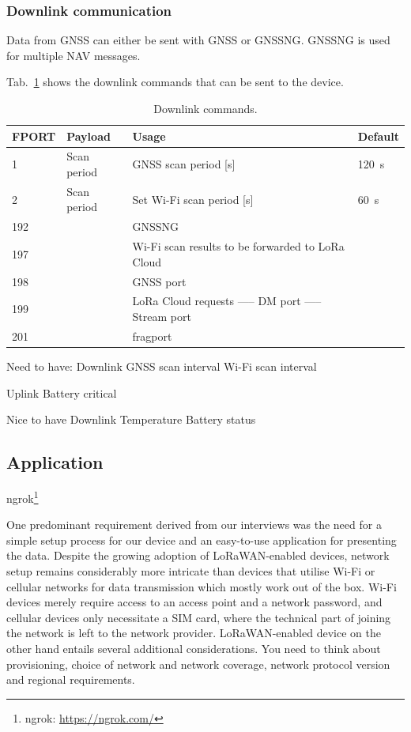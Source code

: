 \subsubsection{Downlink communication}
Data from \ac{GNSS} can either be sent with \ac{GNSS} or \ac{GNSSNG}. \ac{GNSSNG} is used for multiple NAV messages.

Tab.~\ref{tab:downlink_commands} shows the downlink commands that can be sent to the device.

\begin{table}[H]
\centering
\caption{Downlink commands.}
\label{tab:downlink_commands}
\begin{tabular}{l|l|p{9cm}|l}
\ac{FPORT} & Payload & Usage & Default \\ \hline
1 & Scan period & \ac{GNSS} scan period [s] & \SI{120}{\second} \\
2 & Scan period & Set Wi-Fi scan period [s] & \SI{60}{\second} \\
192 & & \ac{GNSSNG}  & \\
197 & & Wi-Fi scan results to be forwarded to LoRa Cloud & \\
198 & & \ac{GNSS} port  & \\
199 & & LoRa Cloud requests ----- DM port ----- Stream port  & \\
201 & & fragport  & \\
\end{tabular}
\end{table}

Need to have:
Downlink
\ac{GNSS} scan interval
Wi-Fi scan interval

Uplink
Battery critical

Nice to have
Downlink
Temperature
Battery status

\subsection{Application}

ngrok\footnote{ngrok: \url{https://ngrok.com/}}

One predominant requirement derived from our interviews was the need for a simple setup process for our device and an easy-to-use application for presenting the data.
Despite the growing adoption of \ac{LoRaWAN}-enabled devices, network setup remains considerably more intricate than devices that utilise Wi-Fi or cellular networks for data transmission which mostly work out of the box. Wi-Fi devices merely require access to an access point and a network password, and cellular devices only necessitate a SIM card, where the technical part of joining the network is left to the network provider. \ac{LoRaWAN}-enabled device on the other hand entails several additional considerations. You need to think about provisioning, choice of network and network coverage, network protocol version and regional requirements.

